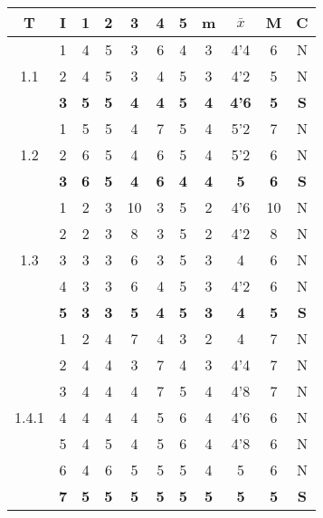 \documentclass[11pt,a4paper,spanish,twoside]{report}
\begin{document}
\begin{table}[!h]
\centering
  \begin{tabular}{|c|c||c|c|c|c|c||c|c|c||c|}
    \hline
    \textbf{T} & \textbf{I} & \textbf{1} &
    \textbf{2} & \textbf{3} & \textbf{4} & \textbf{5} & \textbf{m}
    &\textbf{$\bar{x}$} &\textbf{M} & \textbf{C}\\
    \hline \hline
    \multirow{3}{*}{1.1} & 1 & 4 & 5 & 3 & 6 & 4 & 3 & 4'4 & 6 & N \\
    & 2 & 4 & 5 & 3 & 4 & 5 & 3 & 4'2 & 5 & N\\
    &\textbf{3} &\textbf {5} &\textbf {5} &\textbf {4} &\textbf {4} &\textbf{5} & \textbf{4} & \textbf{4'6} &\textbf{5} & \textbf{S}\\
    \hline

    \multirow{3}{*}{1.2} & 1 & 5 & 5 & 4 & 7 & 5 & 4 & 5'2 & 7 & N\\
    & 2 & 6 & 5 & 4 & 6 & 5 & 4 & 5'2 & 6 & N\\
    &\textbf{3} & \textbf{6} & \textbf{5} & \textbf{4} & \textbf{6} &
    \textbf{4} & \textbf{4} & \textbf{5} & \textbf{6} & \textbf{S} \\    
    \hline

    \multirow{5}{*}{1.3} & 1 & 2 & 3 & 10 & 3 & 5 & 2 & 4'6 & 10& N\\
    & 2 & 2 & 3 & 8 & 3 & 5 & 2 & 4'2 & 8 & N \\
    & 3 & 3 & 3 & 6 & 3 & 5 & 3 & 4 & 6 & N \\
    & 4 & 3 & 3 & 6 & 4 & 5 & 3 & 4'2 & 6 & N \\
    & \textbf{5} & \textbf{3} & \textbf{3} & \textbf{5} & \textbf{4} & \textbf{5} & \textbf{3} & \textbf{4} & \textbf{5} & \textbf{S} \\
    \hline

    \multirow{7}{*}{1.4.1} & 1 & 2 & 4 & 7 & 4 & 3 & 2 & 4 & 7 & N\\
    & 2 & 4 & 4 & 3 & 7 & 4 & 3 & 4'4 & 7 & N \\
    & 3 & 4 & 4 & 4 & 7 & 5 & 4 & 4'8 & 7 & N \\
    & 4 & 4 & 4 & 4 & 5 & 6 & 4 & 4'6 & 6 & N \\
    & 5 & 4 & 5 & 4 & 5 & 6 & 4 & 4'8 & 6 & N \\
    & 6 & 4 & 6 & 5 & 5 & 5 & 4 & 5 & 6 & N \\
    & \textbf{7} & \textbf{5} & \textbf{5} & \textbf{5} & \textbf{5} & \textbf{5} & \textbf{5} & \textbf{5} & \textbf{5} & \textbf{S} \\
    \hline


\end{tabular}
\end{table}
\end{document}

